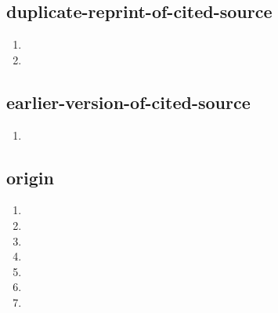 \documentclass{article}
\begin{document}
\subsection{duplicate-reprint-of-cited-source}
\begin{enumerate}
\item {}
\item {}
\end{enumerate}

\subsection{earlier-version-of-cited-source}
\begin{enumerate}
\item {}
\end{enumerate}

\subsection{origin}
\begin{enumerate}
\item {}
\item {}
\item {}
\item {}
\item {}
\item {}
\item {}
\end{enumerate}
\end{document}
